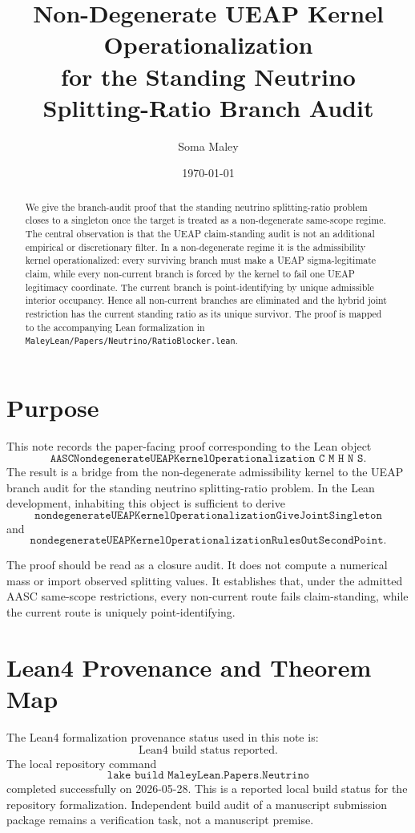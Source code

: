 \documentclass[11pt]{article}
\title{Non-Degenerate UEAP Kernel Operationalization\\
for the Standing Neutrino Splitting-Ratio Branch Audit}
\author{Soma Maley}
\date{\today}
\theoremstyle{definition}
\begin{document}
\maketitle

\begin{abstract}
We give the branch-audit proof that the standing neutrino splitting-ratio
problem closes to a singleton once the target is treated as a non-degenerate
same-scope regime. The central observation is that the UEAP claim-standing
audit is not an additional empirical or discretionary filter. In a
non-degenerate regime it is the admissibility kernel operationalized: every
surviving branch must make a UEAP sigma-legitimate claim, while every
non-current branch is forced by the kernel to fail one UEAP legitimacy
coordinate. The current branch is point-identifying by unique admissible
interior occupancy. Hence all non-current branches are eliminated and the
hybrid joint restriction has the current standing ratio as its unique
survivor. The proof is mapped to the accompanying Lean formalization in
\texttt{MaleyLean/Papers/Neutrino/RatioBlocker.lean}.
\end{abstract}

\section{Purpose}

This note records the paper-facing proof corresponding to the Lean object
\[
\texttt{AASCNondegenerateUEAPKernelOperationalization C M H N S}.
\]
The result is a bridge from the non-degenerate admissibility kernel to the
UEAP branch audit for the standing neutrino splitting-ratio problem. In the
Lean development, inhabiting this object is sufficient to derive
\[
\texttt{nondegenerateUEAPKernelOperationalizationGiveJointSingleton}
\]
and
\[
\texttt{nondegenerateUEAPKernelOperationalizationRulesOutSecondPoint}.
\]

The proof should be read as a closure audit. It does not compute a numerical
mass or import observed splitting values. It establishes that, under the
admitted AASC same-scope restrictions, every non-current route fails
claim-standing, while the current route is uniquely point-identifying.

\section{Lean4 Provenance and Theorem Map}

The Lean4 formalization provenance status used in this note is:
\[
\text{Lean4 build status reported.}
\]
The local repository command
\[
\texttt{lake build MaleyLean.Papers.Neutrino}
\]
completed successfully on 2026-05-28. This is a reported local build status
for the repository formalization. Independent build audit of a manuscript
submission package remains a verification task, not a manuscript premise.
\end{document}
